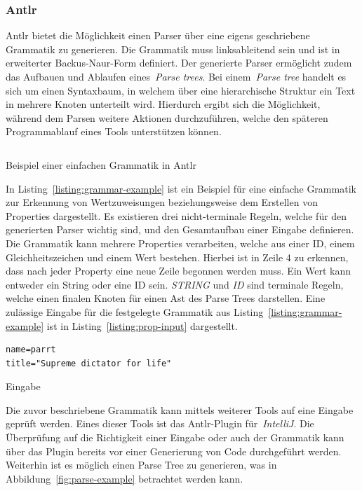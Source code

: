 \subsubsection{Antlr}\label{subsubsec:antlr}
\ac{Antlr} bietet die Möglichkeit einen Parser über eine eigens geschriebene Grammatik zu generieren.
Die Grammatik muss linksableitend sein und ist in erweiterter Backus-Naur-Form definiert.
Der generierte Parser ermöglicht zudem das Aufbauen und Ablaufen eines~\textit{Parse trees}.
Bei einem~\textit{Parse tree} handelt es sich um einen Syntaxbaum, in welchem über eine hierarchische Struktur ein Text in mehrere Knoten unterteilt wird.
Hierdurch ergibt sich die Möglichkeit, während dem Parsen weitere Aktionen durchzuführen, welche den späteren Programmablauf eines Tools unterstützen können.

\begin{listing}[!ht]
    \inputminted{antlr-java}{listings/2.2.1/AntlrExample.g4}
    \caption{Beispiel einer einfachen Grammatik in Antlr}
    \label{listing:grammar-example}
\end{listing}

In Listing~\ref{listing:grammar-example} ist ein Beispiel für eine einfache Grammatik zur Erkennung von Wertzuweisungen beziehungsweise dem Erstellen von
Properties dargestellt\cite*{antlrOrg}.
Es existieren drei nicht-terminale Regeln, welche für den generierten Parser wichtig sind, und den Gesamtaufbau einer Eingabe definieren.
Die Grammatik kann mehrere Properties verarbeiten, welche aus einer ID, einem Gleichheitszeichen und einem Wert bestehen.
Hierbei ist in Zeile 4 zu erkennen, dass nach jeder Property eine neue Zeile begonnen werden muss.
Ein Wert kann entweder ein String oder eine ID sein.
\textit{STRING} und \textit{ID} sind terminale Regeln, welche einen finalen Knoten für einen Ast des Parse Trees darstellen.
Eine zulässige Eingabe für die festgelegte Grammatik aus Listing~\ref{listing:grammar-example} ist in Listing~\ref{listing:prop-input} dargestellt.

\begin{listing}[!ht]
    \begin{verbatim}
name=parrt
title="Supreme dictator for life"

    \end{verbatim}
    \caption{Eingabe}
    \label{listing:prop-input}
\end{listing}

Die zuvor beschriebene Grammatik kann mittels weiterer Tools auf eine Eingabe geprüft werden.
Eines dieser Tools ist das \ac{Antlr}-Plugin für~\textit{IntelliJ}.
Die Überprüfung auf die Richtigkeit einer Eingabe oder auch der Grammatik kann über das Plugin bereits vor einer Generierung von Code durchgeführt werden.
Weiterhin ist es möglich einen Parse Tree zu generieren, was in Abbildung~\ref{fig:parse-example} betrachtet werden kann.

